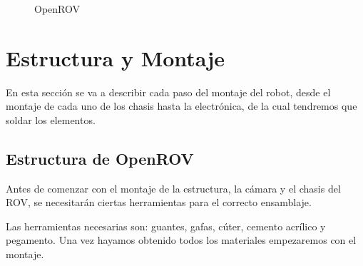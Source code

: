 \begin{figure}[hbtp]
  \begin{center}
  \end{center}
  \caption{OpenROV}
  \label{fig:ROV-ej}
\end{figure}

\section{Estructura y Montaje}
\label{cap:montaje}

En esta sección se va a describir cada paso del montaje del robot, desde el montaje de cada uno de los chasis hasta la electrónica, de la cual tendremos que soldar los elementos.

\subsection{Estructura de OpenROV}
\label{subsec:EstructuraOpenROV}

Antes de comenzar con el montaje de la estructura, la cámara y el chasis del ROV, se necesitarán ciertas herramientas para el correcto ensamblaje.

Las herramientas necesarias son: guantes, gafas, cúter, cemento acrílico y pegamento. Una vez hayamos obtenido todos los materiales empezaremos con el montaje.


